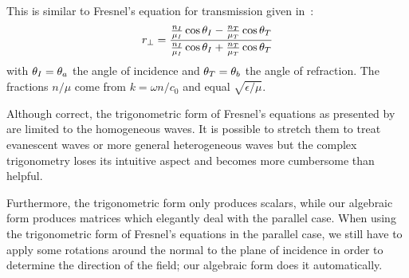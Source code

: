 This is similar to Fresnel's equation for transmission given
in~\textcite{hecht2002optics}:
\begin{equation}
    r_\perp
    =
    \frac{
        \frac{n_I}{\mu_I} \cos \theta_I
        -
        \frac{n_T}{\mu_T} \cos \theta_T
    }{
        \frac{n_I}{\mu_I} \cos \theta_I
        +
        \frac{n_T}{\mu_T} \cos \theta_T
    }
\end{equation}
with $\theta_I=\theta_a$ the angle of incidence and $\theta_T=\theta_b$ the angle of refraction.
The fractions $n/\mu$ come from $k=\omega n/c_0$ and equal $\sqrt{\epsilon/\mu}$.

Although correct, the trigonometric form of Fresnel's equations as presented by~\textcite{hecht2002optics} are limited to the homogeneous waves.
It is possible to stretch them to treat evanescent waves or more general heterogeneous waves but the complex trigonometry loses its intuitive aspect and becomes more cumbersome than helpful.

Furthermore, the trigonometric form only produces scalars, while our algebraic form produces matrices which elegantly deal with the parallel case.
When using the trigonometric form of Fresnel's equations in the parallel case, we still have to apply some rotations around the normal to the plane of incidence in order to determine the direction of the field;
our algebraic form does it automatically.

